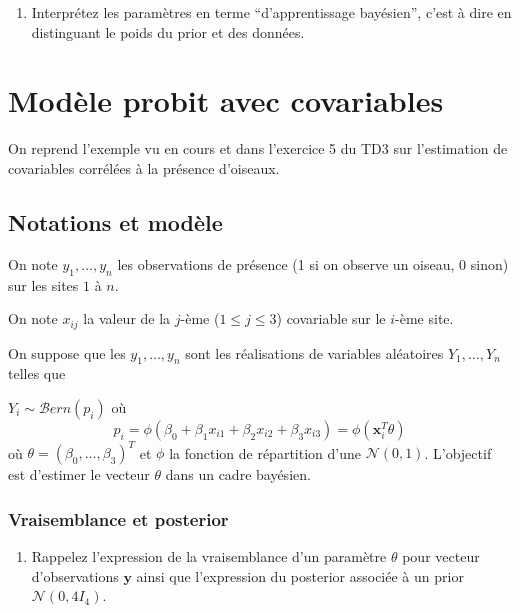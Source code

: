 \documentclass[]{article}
\providecommand{\tightlist}{%
  \setlength{\itemsep}{0pt}\setlength{\parskip}{0pt}}
\begin{document}
\begin{enumerate}
\def\labelenumi{\arabic{enumi}.}
\setcounter{enumi}{1}
\tightlist
\item
  Interprétez les paramètres en terme ``d'apprentissage bayésien'',
  c'est à dire en distinguant le poids du prior et des données.
\end{enumerate}

\hypertarget{moduxe8le-probit-avec-covariables}{%
\section{Modèle probit avec
covariables}\label{moduxe8le-probit-avec-covariables}}

On reprend l'exemple vu en cours et dans l'exercice 5 du TD3 sur
l'estimation de covariables corrélées à la présence d'oiseaux.

\hypertarget{notations-et-moduxe8le}{%
\subsection{Notations et modèle}\label{notations-et-moduxe8le}}

On note \(y_1, \dots, y_n\) les observations de présence (1 si on
observe un oiseau, 0 sinon) sur les sites \(1\) à \(n\).

On note \(x_{ij}\) la valeur de la \(j\)-ème (\(1\leq j \leq 3\))
covariable sur le \(i\)-ème site.

On suppose que les \(y_1, \dots, y_n\) sont les réalisations de
variables aléatoires \(Y_1, \dots, Y_n\) telles que

\(Y_i \sim \mathcal{B}ern(p_i)\) où
\[p_i = \phi(\beta_0 + \beta_1 x_{i1} + \beta_2x_{i2} + \beta_3 x_{i3}) = \phi(\mathbf{x}_i^T\theta)\]
où \(\theta = (\beta_0,\dots, \beta_3)^T\) et \(\phi\) la fonction de
répartition d'une \(\mathcal{N}(0, 1)\). L'objectif est d'estimer le
vecteur \(\theta\) dans un cadre bayésien.

\hypertarget{vraisemblance-et-posterior}{%
\subsubsection{Vraisemblance et
posterior}\label{vraisemblance-et-posterior}}

\begin{enumerate}
\def\labelenumi{\arabic{enumi}.}
\tightlist
\item
  Rappelez l'expression de la vraisemblance d'un paramètre \(\theta\)
  pour vecteur d'observations \(\mathbf{y}\) ainsi que l'expression du
  posterior associée à un prior \(\mathcal{N}(0, 4I_4)\).
\end{enumerate}
\end{document}
